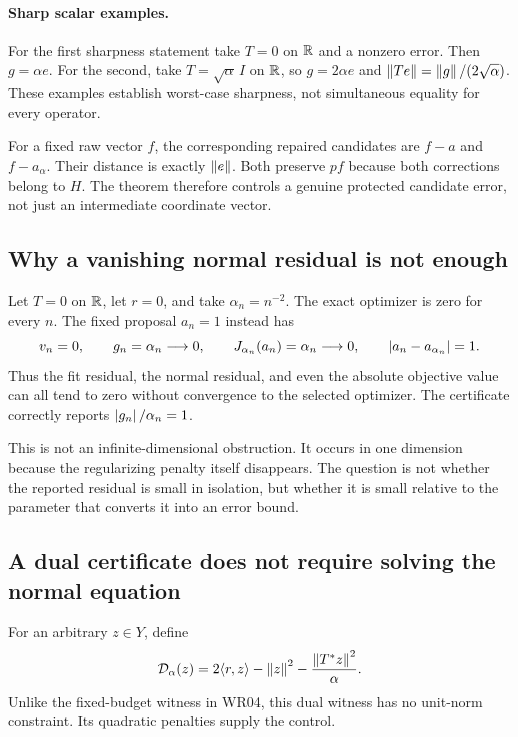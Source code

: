 \paragraph{Sharp scalar examples.} For the first sharpness statement take $T=0$ on $\mathbb R$ and a nonzero error. Then $g=\alpha e$. For the second, take $T=\sqrt\alpha\,I$ on $\mathbb R$, so $g=2\alpha e$ and $\left\lVert Te\right\rVert=\left\lVert g\right\rVert/(2\sqrt\alpha)$. These examples establish worst-case sharpness, not simultaneous equality for every operator.

For a fixed raw vector $f$, the corresponding repaired candidates are $f-a$ and $f-a_\alpha$. Their distance is exactly $\left\lVert e\right\rVert$. Both preserve $pf$ because both corrections belong to $H$. The theorem therefore controls a genuine protected candidate error, not just an intermediate coordinate vector.


\subsection{Why a vanishing normal residual is not enough}
Let $T=0$ on $\mathbb R$, let $r=0$, and take $\alpha_n=n^{-2}$. The exact optimizer is zero for every $n$. The fixed proposal $a_n=1$ instead has
\[
 v_n=0,\qquad g_n=\alpha_n\longrightarrow0,\qquad
 J_{\alpha_n}(a_n)=\alpha_n\longrightarrow0,
 \qquad\left\lvert a_n-a_{\alpha_n}\right\rvert=1.
\]
Thus the fit residual, the normal residual, and even the absolute objective value can all tend to zero without convergence to the selected optimizer. The certificate correctly reports $\left\lvert g_n\right\rvert/\alpha_n=1$.

This is not an infinite-dimensional obstruction. It occurs in one dimension because the regularizing penalty itself disappears. The question is not whether the reported residual is small in isolation, but whether it is small relative to the parameter that converts it into an error bound.

\subsection{A dual certificate does not require solving the normal equation}
For an arbitrary $z\in Y$, define
\[
 \mathcal D_\alpha(z)=2\langle r,z\rangle-\left\lVert z\right\rVert^2
                    -\frac{\left\lVert T^*z\right\rVert^2}{\alpha}.
\]
Unlike the fixed-budget witness in WR04, this dual witness has no unit-norm constraint. Its quadratic penalties supply the control.

